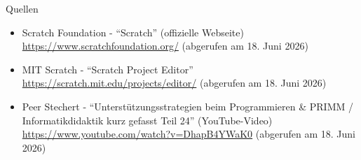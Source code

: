 \documentclass{beamer}
\begin{document}
	\begin{frame}{Quellen}
		\begin{itemize}
			\item Scratch Foundation - “Scratch” (offizielle Webseite) \url{https://www.scratchfoundation.org/} (abgerufen am 18. Juni 2026)
			
			\item MIT Scratch - “Scratch Project Editor” \url{https://scratch.mit.edu/projects/editor/} (abgerufen am 18. Juni 2026)
			
			\item Peer Stechert - “Unterstützungsstrategien beim Programmieren \& PRIMM / Informatikdidaktik kurz gefasst Teil 24” (YouTube-Video) \url{https://www.youtube.com/watch?v=DhapB4YWaK0} (abgerufen am 18. Juni 2026)
		\end{itemize}
	\end{frame}
	
\end{document}
